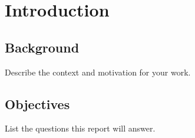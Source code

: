 \chapter{Introduction}
\section{Background}
Describe the context and motivation for your work.

\section{Objectives}
List the questions this report will answer.
